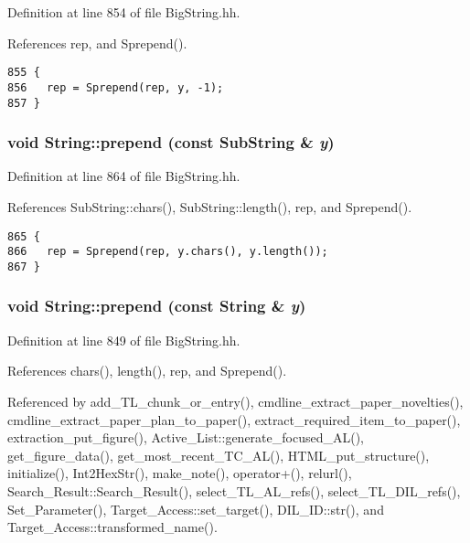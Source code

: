 Definition at line 854 of file Big\-String.hh.

References rep, and Sprepend().



\footnotesize\begin{verbatim}855 {
856   rep = Sprepend(rep, y, -1); 
857 }
\end{verbatim}\normalsize 
{}
\subsubsection{\setlength{\rightskip}{0pt plus 5cm}void String::prepend (const {\bf Sub\-String} \& {\em y})\hspace{0.3cm}{\tt  [inline]}}\label{classString_a23}




Definition at line 864 of file Big\-String.hh.

References Sub\-String::chars(), Sub\-String::length(), rep, and Sprepend().



\footnotesize\begin{verbatim}865 {
866   rep = Sprepend(rep, y.chars(), y.length());
867 }
\end{verbatim}\normalsize 
{}
\subsubsection{\setlength{\rightskip}{0pt plus 5cm}void String::prepend (const String \& {\em y})\hspace{0.3cm}{\tt  [inline]}}\label{classString_a22}




Definition at line 849 of file Big\-String.hh.

References chars(), length(), rep, and Sprepend().

Referenced by add\_\-TL\_\-chunk\_\-or\_\-entry(), cmdline\_\-extract\_\-paper\_\-novelties(), cmdline\_\-extract\_\-paper\_\-plan\_\-to\_\-paper(), extract\_\-required\_\-item\_\-to\_\-paper(), extraction\_\-put\_\-figure(), Active\_\-List::generate\_\-focused\_\-AL(), get\_\-figure\_\-data(), get\_\-most\_\-recent\_\-TC\_\-AL(), HTML\_\-put\_\-structure(), initialize(), Int2Hex\-Str(), make\_\-note(), operator+(), relurl(), Search\_\-Result::Search\_\-Result(), select\_\-TL\_\-AL\_\-refs(), select\_\-TL\_\-DIL\_\-refs(), Set\_\-Parameter(), Target\_\-Access::set\_\-target(), DIL\_\-ID::str(), and Target\_\-Access::transformed\_\-name().



